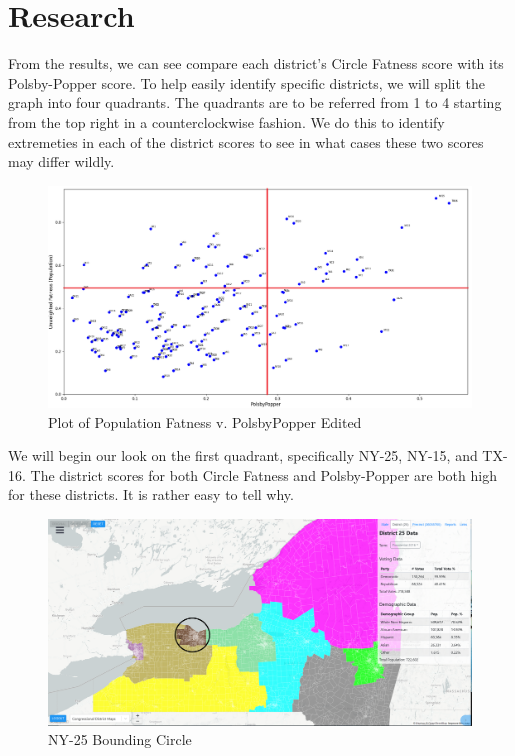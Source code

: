 \documentclass[letterpaper]{article}
\begin{document}
\section{Research}
From the results, we can see compare each district's Circle Fatness score with its Polsby-Popper score. To help easily identify specific districts, we will split the graph into four quadrants. The quadrants are to be referred from 1 to 4 starting from the top right in a counterclockwise fashion. We do this to identify extremeties in each of the district scores to see in what cases these two scores may differ wildly.

\begin{figure}[H]
	\includegraphics[width=\linewidth]{./figures/fatnessPopulationVpolsbyPopperEdited.png}
	\caption{Plot of Population Fatness v. PolsbyPopper Edited}
	\label{fig:datapointsEdited}
\end{figure}

We will begin our look on the first quadrant, specifically NY-25, NY-15, and TX-16. The district scores for both Circle Fatness and Polsby-Popper are both high for these districts. It is rather easy to tell why.

\begin{figure}[H]
	\includegraphics[width=\linewidth]{./figures/NY-25-BoundingCircle.png}
	\caption{NY-25 Bounding Circle}
	\label{fig:ny25boundingCircle}
\end{figure}
\end{document}
